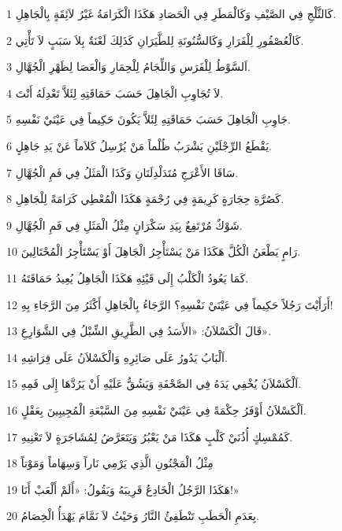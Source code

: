 \par 1 كَالثَّلْجِ فِي الصَّيْفِ وَكَالْمَطَرِ فِي الْحَصَادِ هَكَذَا الْكَرَامَةُ غَيْرُ لاَئِقَةٍ بِالْجَاهِلِ.
\par 2 كَالْعُصْفُورِ لِلْفَرَارِ وَكَالسُّنُونَةِ لِلطَّيَرَانِ كَذَلِكَ لَعْنَةٌ بِلاَ سَبَبٍ لاَ تَأْتِي.
\par 3 اَلسَّوْطُ لِلْفَرَسِ وَاللِّجَامُ لِلْحِمَارِ وَالْعَصَا لِظَهْرِ الْجُهَّالِ.
\par 4 لاَ تُجَاوِبِ الْجَاهِلَ حَسَبَ حَمَاقَتِهِ لِئَلاَّ تَعْدِلَهُ أَنْتَ.
\par 5 جَاوِبِ الْجَاهِلَ حَسَبَ حَمَاقَتِهِ لِئَلاَّ يَكُونَ حَكِيماً فِي عَيْنَيْ نَفْسِهِ.
\par 6 يَقْطَعُ الرِّجْلَيْنِ يَشْرَبُ ظُلْماً مَنْ يُرْسِلُ كَلاَماً عَنْ يَدِ جَاهِلٍ.
\par 7 سَاقَا الأَعْرَجِ مُتَدَلْدِلَتَانِ وَكَذَا الْمَثَلُ فِي فَمِ الْجُهَّالِ.
\par 8 كَصُرَّةِ حِجَارَةٍ كَرِيمَةٍ فِي رُجْمَةٍ هَكَذَا الْمُعْطِي كَرَامَةً لِلْجَاهِلِ.
\par 9 شَوْكٌ مُرْتَفِعٌ بِيَدِ سَكْرَانٍ مِثْلُ الْمَثَلِ فِي فَمِ الْجُهَّالِ.
\par 10 رَامٍ يَطْعَنُ الْكُلَّ هَكَذَا مَنْ يَسْتَأْجِرُ الْجَاهِلَ أَوْ يَسْتَأْجِرُ الْمُحْتَالِينَ.
\par 11 كَمَا يَعُودُ الْكَلْبُ إِلَى قَيْئِهِ هَكَذَا الْجَاهِلُ يُعِيدُ حَمَاقَتَهُ.
\par 12 أَرَأَيْتَ رَجُلاً حَكِيماً فِي عَيْنَيْ نَفْسِهِ؟ الرَّجَاءُ بِالْجَاهِلِ أَكْثَرُ مِنَ الرَّجَاءِ بِهِ!
\par 13 قَالَ الْكَسْلاَنُ: «الأَسَدُ فِي الطَّرِيقِ الشِّبْلُ فِي الشَّوَارِعِ».
\par 14 اَلْبَابُ يَدُورُ عَلَى صَائِرِهِ وَالْكَسْلاَنُ عَلَى فِرَاشِهِ.
\par 15 اَلْكَسْلاَنُ يُخْفِي يَدَهُ فِي الصَّحْفَةِ وَيَشُقُّ عَلَيْهِ أَنْ يَرُدَّهَا إِلَى فَمِهِ.
\par 16 اَلْكَسْلاَنُ أَوْفَرُ حِكْمَةً فِي عَيْنَيْ نَفْسِهِ مِنَ السَّبْعَةِ الْمُجِيبِينَ بِعَقْلٍ.
\par 17 كَمُمْسِكٍ أُذُنَيْ كَلْبٍ هَكَذَا مَنْ يَعْبُرُ وَيَتَعَرَّضُ لِمُشَاجَرَةٍ لاَ تَعْنِيهِ.
\par 18 مِثْلُ الْمَجْنُونِ الَّذِي يَرْمِي نَاراً وَسِهَاماً وَمَوْتاً
\par 19 هَكَذَا الرَّجُلُ الْخَادِعُ قَرِيبَهُ وَيَقُولُ: «أَلَمْ أَلْعَبْ أَنَا!»
\par 20 بِعَدَمِ الْحَطَبِ تَنْطَفِئُ النَّارُ وَحَيْثُ لاَ نَمَّامَ يَهْدَأُ الْخِصَامُ.

